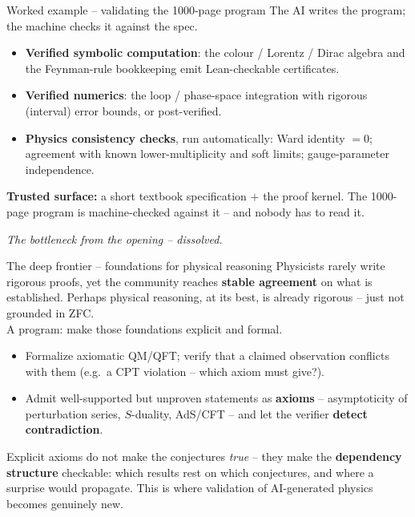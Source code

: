 \documentclass[aspectratio=169,xcolor=dvipsnames]{beamer}
\def\p{\\[0.1in] \pause}
\begin{document}
\begin{frame}{Worked example -- validating the 1000-page program}
The AI writes the program; the machine checks it against the spec.
\begin{itemize}
  \item \textbf{Verified symbolic computation}: the colour / Lorentz / Dirac algebra and the
        Feynman-rule bookkeeping emit Lean-checkable certificates.
  \item \textbf{Verified numerics}: the loop / phase-space integration with rigorous
        (interval) error bounds, or post-verified.
  \item \textbf{Physics consistency checks}, run automatically: Ward identity $=0$;
        agreement with known lower-multiplicity and soft limits; gauge-parameter independence.
\end{itemize} \pause
\smallskip
\textbf{Trusted surface:} a short textbook specification $+$ the proof kernel.  The
1000-page program is machine-checked against it -- and nobody has to read it. \pause
\smallskip
\begin{center}\emph{The bottleneck from the opening -- dissolved.}\end{center}
\end{frame}

\begin{frame}{The deep frontier -- foundations for physical reasoning}
Physicists rarely write rigorous proofs, yet the community reaches \textbf{stable agreement}
on what is established.  Perhaps physical reasoning, at its best, is already rigorous --
just not grounded in ZFC. \p
\pause
A program: make those foundations explicit and formal.
\begin{itemize}
  \item Formalize axiomatic QM/QFT; verify that a claimed observation conflicts with them
        (e.g.\ a CPT violation -- which axiom must give?).
  \item Admit well-supported but unproven statements as \textbf{axioms} -- asymptoticity of
        perturbation series, $S$-duality, AdS/CFT -- and let the verifier \textbf{detect contradiction}.
\end{itemize} \pause
\smallskip
Explicit axioms do not make the conjectures \emph{true} -- they make the \textbf{dependency
structure} checkable: which results rest on which conjectures, and where a surprise would
propagate.  This is where validation of AI-generated physics becomes genuinely new.
\end{frame}
\end{document}

